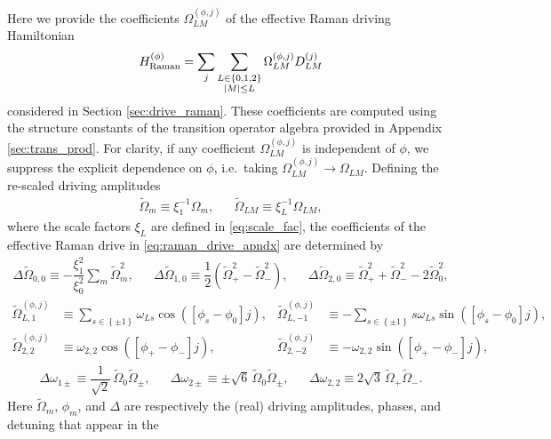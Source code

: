 \documentclass[nofootinbib,notitlepage,11pt]{revtex4-2}
\renewcommand{\t}{\text} %
\newcommand{\f}[2]{\dfrac{#1}{#2}} %
\newcommand{\p}[1]{\left(#1\right)} %
\renewcommand{\sp}[1]{\left[#1\right]} %
\renewcommand{\set}[1]{\left\{#1\right\}} %
\newcommand{\1}{\mathds{1}}
\begin{document}
Here we provide the coefficients $\Omega_{LM}^{(\phi,j)}$ of the
effective Raman driving Hamiltonian
\begin{align}
  H_{\t{Raman}}^{(\phi)}
  = \sum_j \sum_{\substack{L\in\set{0,1,2}\\\abs{M}\le L}}
  \Omega_{LM}^{(\phi,j)} D_{LM}^{(j)}
  \label{eq:raman_drive_apndx}
\end{align}
considered in Section \ref{sec:drive_raman}.  These coefficients are
computed using the structure constants of the transition operator
algebra provided in Appendix \ref{sec:trans_prod}.  For clarity, if
any coefficient $\Omega_{LM}^{(\phi,j)}$ is independent of $\phi$, we
suppress the explicit dependence on $\phi$, i.e.~taking
$\Omega_{LM}^{(\phi,j)}\to\Omega_{LM}$.  Defining the re-scaled
driving amplitudes
\begin{align}
  \tilde\Omega_m \equiv \xi_1^{-1} \Omega_m,
  &&
  \tilde\Omega_{LM} \equiv \xi_L^{-1} \Omega_{LM},
\end{align}
where the scale factors $\xi_L$ are defined in \eqref{eq:scale_fac},
the coefficients of the effective Raman drive in
\eqref{eq:raman_drive_apndx} are determined by
\begin{align}
  \Delta \tilde\Omega_{0,0}
  \equiv -\f{\xi_1^2}{\xi_0^2} \sum_m \tilde\Omega_m^2,
  &&
  \Delta \tilde\Omega_{1,0}
  \equiv \f12 \p{\tilde\Omega_+^2 - \tilde\Omega_-^2},
  &&
  \Delta \tilde\Omega_{2,0}
  \equiv \tilde\Omega_+^2 + \tilde\Omega_-^2 - 2\tilde\Omega_0^2,
  \label{eq:O_X0}
\end{align}
\begin{align}
  \tilde\Omega_{L,1}^{(\phi,j)}
  &\equiv \sum_{s\in\set{\pm1}}
  \omega_{Ls} \cos\p{\sp{\phi_s-\phi_0}j},
  &
  \tilde\Omega_{L,-1}^{(\phi,j)}
  &\equiv -\sum_{s\in\set{\pm1}}
  s \omega_{Ls} \sin\p{\sp{\phi_s-\phi_0}j}, \\
  \tilde\Omega_{2,2}^{(\phi,j)}
  &\equiv \omega_{2,2} \cos\p{\sp{\phi_+-\phi_-}j},
  &
  \tilde\Omega_{2,-2}^{(\phi,j)}
  &\equiv -\omega_{2,2} \sin\p{\sp{\phi_+-\phi_-}j},
\end{align}
\begin{align}
  \Delta \omega_{1\pm}
  \equiv \f1{\sqrt{2}} \, \tilde\Omega_0 \tilde\Omega_\pm,
  &&
  \Delta \omega_{2\pm}
  \equiv \pm \sqrt{6} \, \tilde\Omega_0\tilde\Omega_\pm,
  &&
  \Delta \omega_{2,2}
  \equiv 2\sqrt{3} \, \tilde\Omega_+\tilde\Omega_-.
\end{align}
Here $\tilde\Omega_m$, $\phi_m$, and $\Delta$ are respectively the
(real) driving amplitudes, phases, and detuning that appear in the
\end{document}
